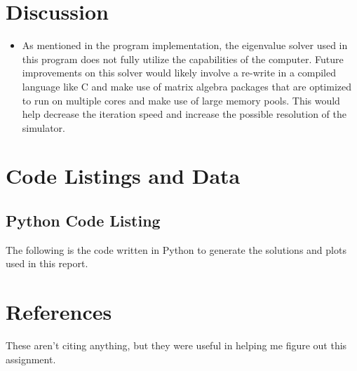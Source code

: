 \documentclass[10pt, oneside, letterpaper]{article}
\begin{document}
\section{Discussion}

\begin{itemize}
    \item As mentioned in the program implementation, the eigenvalue solver used in this program does not fully utilize the capabilities of the computer. Future improvements on this solver would likely involve a re-write in a compiled language like C and make use of matrix algebra packages that are optimized to run on multiple cores and make use of large memory pools. This would help decrease the iteration speed and increase the possible resolution of the simulator.
\end{itemize}

\newpage
\section{Code Listings and Data}

\subsection{Python Code Listing}
\label{code-listing-python}
The following is the code written in Python to generate the solutions and plots used in this report.


\newpage
\section{References}

These aren't citing anything, but they were useful in helping me figure out this assignment.
\end{document}

